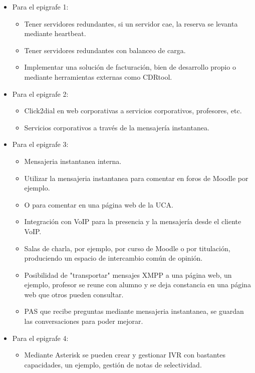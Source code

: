 \documentclass{article}
\begin{document}
\begin{itemize}
\item Para el epigrafe 1:
  \begin{itemize}
  \item Tener servidores redundantes, si un servidor cae, la reserva se levanta mediante heartbeat.
  \item Tener servidores redundantes con balanceo de carga.
  \item Implementar una solución de facturación, bien de desarrollo propio o mediante herramientas externas como CDRtool.
  \end{itemize}
\item Para el epigrafe 2:
  \begin{itemize}
  \item Click2dial en web corporativas a servicios corporativos, profesores, etc.
  \item Servicios corporativos a través de la mensajería instantanea.
  \end{itemize}
\item Para el epigrafe 3:
  \begin{itemize}
  \item Mensajeria instantanea interna.
  \item Utilizar la mensajeria instantanea para comentar en foros de Moodle por ejemplo.
  \item O para comentar en una página web de la UCA.

  \item Integración con VoIP para la presencia y la mensajería desde el cliente VoIP.

  \item Salas de charla, por ejemplo, por curso de Moodle o por titulación, produciendo un espacio de intercambio común de opinión.

  \item Posibilidad de "transportar" mensajes XMPP a una página web, un ejemplo, profesor se reune con alumno y se deja constancia en una página web que otros pueden consultar.

  \item PAS que recibe preguntas mediante mensajeria instantanea, se guardan las conversaciones para poder mejorar.

  \end{itemize}

\item Para el epigrafe 4:
  \begin{itemize}
  \item Mediante Asterisk se pueden crear y gestionar IVR con bastantes capacidades, un ejemplo, gestión de notas de selectividad.

  
  \end{itemize}
\end{itemize}
\end{document}
